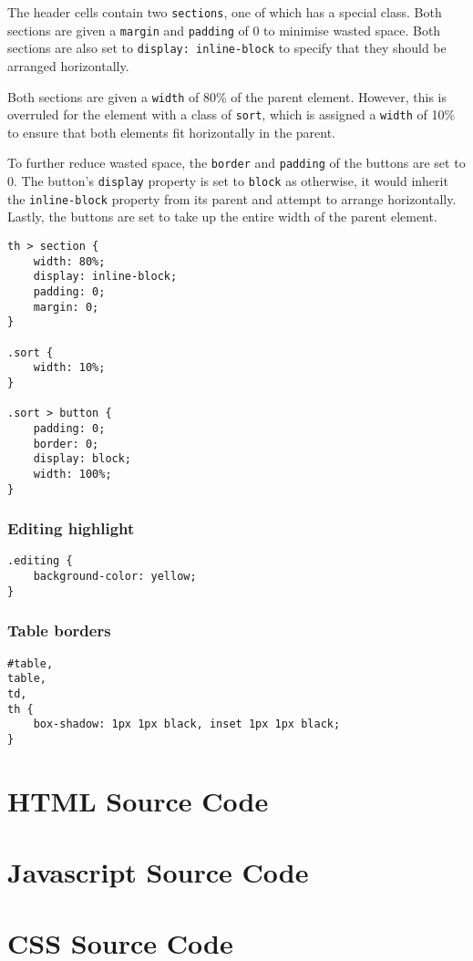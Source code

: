 \documentclass[letterpaper]{article}
\begin{document}
The header cells contain two \lstinline{sections}, one of which has a special class.
Both sections are given a \lstinline{margin} and \lstinline{padding} of 0 to minimise wasted space.
Both sections are also set to \lstinline{display: inline-block} to specify that they should be arranged horizontally.

Both sections are given a \lstinline{width} of 80\% of the parent element.
However, this is overruled for the element with a class of \lstinline{sort}, which is assigned a \lstinline{width} of 10\% to ensure that both elements fit horizontally in the parent.

To further reduce wasted space, the \lstinline{border} and \lstinline{padding} of the buttons are set to 0.
The button's \lstinline{display} property is set to \lstinline{block} as otherwise, it would inherit the \lstinline{inline-block} property from its parent and attempt to arrange horizontally.
Lastly, the buttons are set to take up the entire width of the parent element.

\begin{lstlisting}[firstnumber=47]
th > section {
    width: 80%;
    display: inline-block;
    padding: 0;
    margin: 0;
}

.sort {
    width: 10%;
}

.sort > button {
    padding: 0;
    border: 0;
    display: block;
    width: 100%;
}
\end{lstlisting}

\subsubsection{Editing highlight}

\begin{lstlisting}[firstnumber=65]
.editing {
    background-color: yellow;
}
\end{lstlisting}

\subsubsection{Table borders}

\begin{lstlisting}[firstnumber=69]
#table,
table,
td,
th {
    box-shadow: 1px 1px black, inset 1px 1px black;
}
\end{lstlisting}

\newpage

\appendix
\section{HTML Source Code}


\newpage

\section{Javascript Source Code}


\newpage

\section{CSS Source Code}

\end{document}
